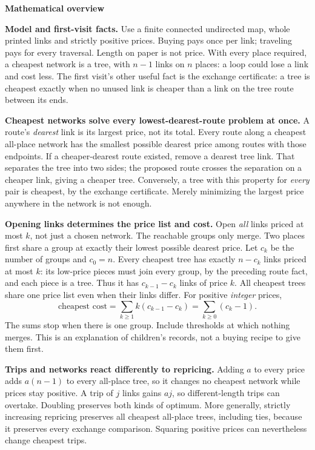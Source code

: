 \documentclass[11pt]{article}
\newcommand{\head}[1]{\par{\large\bfseries #1}\par}
\begin{document}
\head{Mathematical overview}
\textbf{Model and first-visit facts.} Use a finite connected undirected map, whole printed links and strictly positive prices. Buying pays once per link; traveling pays for every traversal. Length on paper is not price. With every place required, a cheapest network is a tree, with $n-1$ links on $n$ places: a loop could lose a link and cost less. The first visit's other useful fact is the exchange certificate: a tree is cheapest exactly when no unused link is cheaper than a link on the tree route between its ends.

\textbf{Cheapest networks solve every lowest-dearest-route problem at once.} A route's \emph{dearest} link is its largest price, not its total. Every route along a cheapest all-place network has the smallest possible dearest price among routes with those endpoints. If a cheaper-dearest route existed, remove a dearest tree link. That separates the tree into two sides; the proposed route crosses the separation on a cheaper link, giving a cheaper tree. Conversely, a tree with this property for \emph{every} pair is cheapest, by the exchange certificate. Merely minimizing the largest price anywhere in the network is not enough.

\textbf{Opening links determines the price list and cost.} Open \emph{all} links priced at most $k$, not just a chosen network. The reachable groups only merge. Two places first share a group at exactly their lowest possible dearest price. Let $c_k$ be the number of groups and $c_0=n$. Every cheapest tree has exactly $n-c_k$ links priced at most $k$: its low-price pieces must join every group, by the preceding route fact, and each piece is a tree. Thus it has $c_{k-1}-c_k$ links of price $k$. All cheapest trees share one price list even when their links differ. For positive \emph{integer} prices,
\[
 \text{cheapest cost}=\sum_{k\ge1}k(c_{k-1}-c_k)=\sum_{k\ge0}(c_k-1).
\]
The sums stop when there is one group. Include thresholds at which nothing merges. This is an explanation of children's records, not a buying recipe to give them first.

\textbf{Trips and networks react differently to repricing.} Adding $a$ to every price adds $a(n-1)$ to every all-place tree, so it changes no cheapest network while prices stay positive. A trip of $j$ links gains $aj$, so different-length trips can overtake. Doubling preserves both kinds of optimum. More generally, strictly increasing repricing preserves all cheapest all-place trees, including ties, because it preserves every exchange comparison. Squaring positive prices can nevertheless change cheapest trips.
\end{document}
